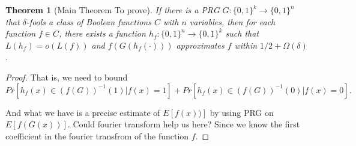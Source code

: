 \documentclass[12pt]{article}
\newtheorem{theorem}{Theorem}[section]
\renewcommand{\.}{,\ldots,}
\begin{document}
\begin{theorem}[Main Theorem To prove]
If there is a PRG $G:\{0,1\}^k\rightarrow \{0,1\}^n$ that $\delta$-fools  a class of Boolean functions $C$ with $n$ variables, then for each function $f\in C$, there exists a function $h_f:\{0,1\}^n\rightarrow \{0,1\}^k$  such that $L(h_f)=o(L(f))$ and $f(G(h_f(\cdot )))$ approximates $f$ within $1/2+\Omega(\delta)$.
\end{theorem}

\begin{proof}
That is, we  need to bound 
$$Pr[h_f(x)\in (f(G))^{-1}(1)|f(x)=1]+Pr[h_f(x)\in (f(G))^{-1}(0)|f(x)=0].$$

And what we have is a precise estimate of $E[f(x))]$ by using PRG on $E[f(G(x))]$. Could fourier transform help us here?  Since we know the first coefficient in the fourier transfrom of the function $f$. 
\end{proof}




\end{document}
